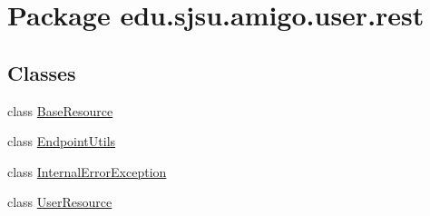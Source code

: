 \hypertarget{namespaceedu_1_1sjsu_1_1amigo_1_1user_1_1rest}{}\section{Package edu.\+sjsu.\+amigo.\+user.\+rest}
\label{namespaceedu_1_1sjsu_1_1amigo_1_1user_1_1rest}
\subsection*{Classes}
\begin{DoxyCompactItemize}
\item 
class \hyperlink{classedu_1_1sjsu_1_1amigo_1_1user_1_1rest_1_1_base_resource}{Base\+Resource}
\item 
class \hyperlink{classedu_1_1sjsu_1_1amigo_1_1user_1_1rest_1_1_endpoint_utils}{Endpoint\+Utils}
\item 
class \hyperlink{classedu_1_1sjsu_1_1amigo_1_1user_1_1rest_1_1_internal_error_exception}{Internal\+Error\+Exception}
\item 
class \hyperlink{classedu_1_1sjsu_1_1amigo_1_1user_1_1rest_1_1_user_resource}{User\+Resource}
\end{DoxyCompactItemize}

